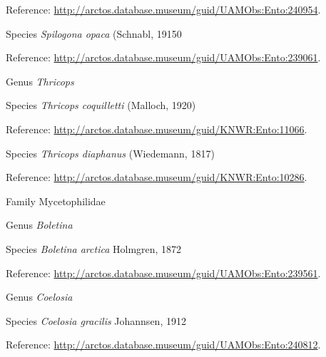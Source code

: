 \documentclass[9pt, article]{memoir}
\begin{document}
\begin{multicols}{2}
\vspace{6pt}Reference: 
\url{http://arctos.database.museum/guid/UAMObs:Ento:240954}.

\vspace{6pt}\noindent\hspace{36pt}Species \textit{Spilogona opaca} (Schnabl, 19150


\vspace{6pt}Reference: 
\url{http://arctos.database.museum/guid/UAMObs:Ento:239061}.

\vspace{6pt}\noindent\hspace{30pt}Genus \textit{Thricops}


\vspace{6pt}\noindent\hspace{36pt}Species \textit{Thricops coquilletti} (Malloch, 1920)


\vspace{6pt}Reference: 
\url{http://arctos.database.museum/guid/KNWR:Ento:11066}.

\vspace{6pt}\noindent\hspace{36pt}Species \textit{Thricops diaphanus} (Wiedemann, 1817)


\vspace{6pt}Reference: 
\url{http://arctos.database.museum/guid/KNWR:Ento:10286}.

\vspace{6pt}\noindent\hspace{24pt}Family Mycetophilidae


\vspace{6pt}\noindent\hspace{30pt}Genus \textit{Boletina}


\vspace{6pt}\noindent\hspace{36pt}Species \textit{Boletina arctica} Holmgren, 1872


\vspace{6pt}Reference: 
\url{http://arctos.database.museum/guid/UAMObs:Ento:239561}.

\vspace{6pt}\noindent\hspace{30pt}Genus \textit{Coelosia}


\vspace{6pt}\noindent\hspace{36pt}Species \textit{Coelosia gracilis} Johannsen, 1912


\vspace{6pt}Reference: 
\url{http://arctos.database.museum/guid/UAMObs:Ento:240812}.


\end{multicols}
\end{document}
